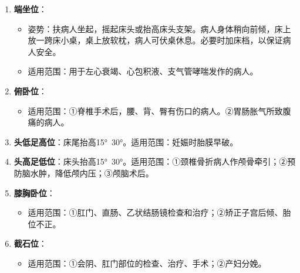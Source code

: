 \documentclass[11pt, a4paper]{ctexart}
\begin{document}
\begin{enumerate}
\begin{itemize}
        \item 适用范围：①面、颈部手术后病人（预防术后局部出血）。②胸腔疾病、胸部创伤、心肺疾患引起的呼吸困难患者。减少腹腔脏器对心肺的压力，增加肺活量，减轻肺淤血和心脏负担，促进呼吸。同时，有利于引流脓液、血液等。③盆腹腔术后或炎症患者。④促进引流；⑤使感染局限盆腔，减少炎症的扩散和毒素的吸收；⑥防止膈下脓肿的形成；⑦减轻腹部切口缝合处的张力，减轻疼痛，利于愈合。④疾病恢复期体弱患者。
    \end{itemize}
    \item \textbf{端坐位}：
    \begin{itemize}
        \item 姿势：扶病人坐起，摇起床头或抬高床头支架。病人身体稍向前倾，床上放一跨床小桌，桌上放软枕，病人可伏桌休息。必要时加床档，以保证病人安全。
        \item 适用范围：用于左心衰竭、心包积液、支气管哮喘发作的病人。
    \end{itemize}
    \item \textbf{俯卧位}：
    \begin{itemize}
        \item 适用范围：①脊椎手术后，腰、背、臀有伤口的病人。②胃肠胀气所致腹痛的病人。
    \end{itemize}
    \item \textbf{头低足高位}：床尾抬高15°~30°。适用范围：妊娠时胎膜早破。
    \item \textbf{头高足低位}：床头抬高15°~30°。适用范围：①颈椎骨折病人作颅骨牵引；②预防脑水肿，降低颅内压；③颅脑术后。
    \item \textbf{膝胸卧位}：
    \begin{itemize}
        \item 适用范围：①肛门、直肠、乙状结肠镜检查和治疗；②矫正子宫后倾、胎位不正。
    \end{itemize}
    \item \textbf{截石位}：
    \begin{itemize}
        \item 适用范围：①会阴、肛门部位的检查、治疗、手术；②产妇分娩。
    \end{itemize}
\end{enumerate}
\end{document}
